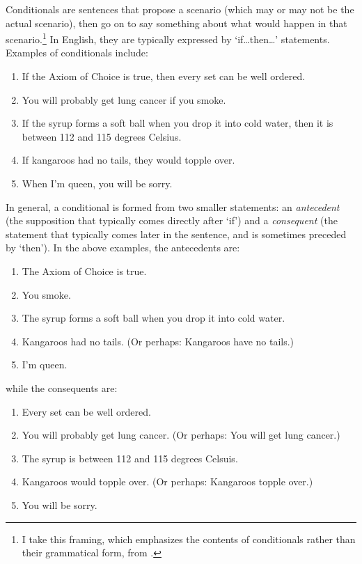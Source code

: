 Conditionals are sentences that propose a scenario (which may or may not be the actual scenario), then go on to say something about what would happen in that scenario.\footnote{I take this framing, which emphasizes the contents of conditionals rather than their grammatical form, from \citep{fintel:conditionals}.}  In English, they are typically expressed by `if\ldots then\ldots' statements.  Examples of conditionals include:
\begin{enumerate}
\item If the Axiom of Choice is true, then every set can be well ordered.
\item You will probably get lung cancer if you smoke.
\item If the syrup forms a soft ball when you drop it into cold water, then it is between 112 and 115 degrees Celsius.
\item If kangaroos had no tails, they would topple over.
\item When I'm queen, you will be sorry.
\end{enumerate}

In general, a conditional is formed from two smaller statements: an \emph{antecedent} (the supposition that typically comes directly after `if') and a \emph{consequent} (the statement that typically comes later in the sentence, and is sometimes preceded by `then').  In the above examples, the antecedents are:
%
\begin{enumerate}
\item The Axiom of Choice is true.
\item You smoke.
\item The syrup forms a soft ball when you drop it into cold water.
\item Kangaroos had no tails.  (Or perhaps: Kangaroos have no tails.)
\item I'm queen.
\end{enumerate}
%
while the consequents are:
%
\begin{enumerate}
\item Every set can be well ordered.
\item You will probably get lung cancer.  (Or perhaps: You will get lung cancer.)
\item The syrup is between 112 and 115 degrees Celsuis.
\item Kangaroos would topple over.  (Or perhaps: Kangaroos topple over.)
\item You will be sorry.
\end{enumerate}


